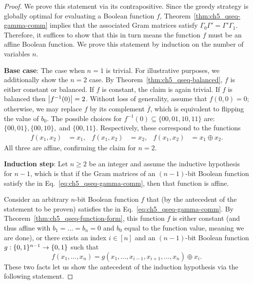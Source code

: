 \begin{proof}
    We prove this statement via its contrapositive.
    Since the greedy strategy is globally optimal for evaluating a Boolean function $f$, Theorem~\ref{thm:ch5_qseq-gamma-comm} implies that the associated Gram matrices satisfy $\Gamma_0 \Gamma' = \Gamma' \Gamma_1$.
    Therefore, it suffices to show that this in turn means the function $f$ must be an affine Boolean function.
    We prove this statement by induction on the number of variables $n$.

    \medskip
    \noindent\textbf{Base case}: The case when $n=1$ is trivial.
    For illustrative purposes, we additionally show the $n=2$ case.
    By Theorem~\ref{thm:ch5_qseq-balanced}, $f$ is either constant or balanced.
    If $f$ is constant, the claim is again trivial.
    If $f$ is balanced then $\abs{f^{-1}(0)} = 2$.
    Without loss of generality, assume that $f(0,0) = 0$; otherwise, we may replace $f$ by its complement $\overline{f}$, which is equivalent to flipping the value of $b_0$.
    The possible choices for $f^{-1}(0) \subseteq \{00, 01, 10, 11\}$ are: $\{00, 01\}, \{00, 10\},$ and $\{00, 11\}$.
    Respectively, these correspond to the functions
    \begin{align}
        f(x_1, x_2) &= x_1,&
        f(x_1, x_2) &= x_2,&
        f(x_1, x_2) &= x_1 \oplus x_2.
    \end{align}
    All three are affine, confirming the claim for $n = 2$.

    \medskip
    \noindent\textbf{Induction step}:
    Let $n \geq 2$ be an integer and assume the inductive hypothesis for $n-1$, which is that if the Gram matrices of an $(n-1)$-bit Boolean function satisfy the \gammacomm{} in Eq.~\eqref{eq:ch5_qseq-gamma-comm}, then that function is affine.

    Consider an arbitrary $n$-bit Boolean function $f$ that (by the antecedent of the statement to be proven) satisfies the \gammacomm{} in Eq.~\eqref{eq:ch5_qseq-gamma-comm}.
    By Theorem~\ref{thm:ch5_qseq-function-form}, this function $f$ is either constant (and thus affine with $b_1=\ldots=b_n=0$ and $b_0$ equal to the function value, meaning we are done), or there exists an index $i \in [n]$ and an $(n-1)$-bit Boolean function $g:\{ 0, 1 \}^{n-1} \to \{ 0, 1 \}$ such that
    \begin{equation}
        f(x_1,\ldots,x_n) = g(x_1,\ldots,x_{i-1},x_{i+1},\ldots,x_n) \oplus x_i.
    \end{equation}
    These two facts let us show the antecedent of the induction hypothesis via the following statement.


\end{proof}
